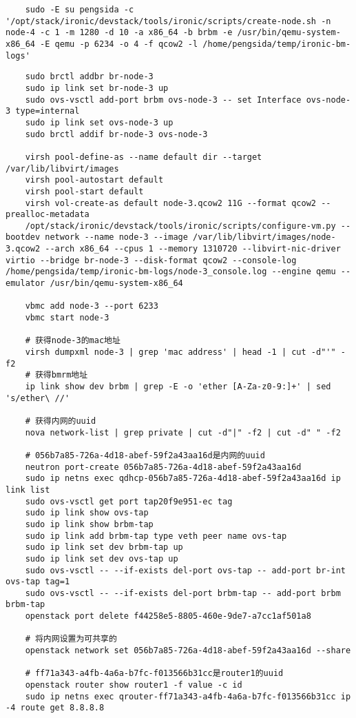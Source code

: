 \documentclass[a4paper,left=1.5cm,right=1.5cm,11pt]{article}
\begin{document}
	\begin{lstlisting}
	sudo -E su pengsida -c '/opt/stack/ironic/devstack/tools/ironic/scripts/create-node.sh -n node-4 -c 1 -m 1280 -d 10 -a x86_64 -b brbm -e /usr/bin/qemu-system-x86_64 -E qemu -p 6234 -o 4 -f qcow2 -l /home/pengsida/temp/ironic-bm-logs'
	\end{lstlisting}

	\begin{lstlisting}
	sudo brctl addbr br-node-3
	sudo ip link set br-node-3 up
	sudo ovs-vsctl add-port brbm ovs-node-3 -- set Interface ovs-node-3 type=internal
	sudo ip link set ovs-node-3 up
	sudo brctl addif br-node-3 ovs-node-3

	virsh pool-define-as --name default dir --target /var/lib/libvirt/images
	virsh pool-autostart default
	virsh pool-start default
	virsh vol-create-as default node-3.qcow2 11G --format qcow2 --prealloc-metadata
	/opt/stack/ironic/devstack/tools/ironic/scripts/configure-vm.py --bootdev network --name node-3 --image /var/lib/libvirt/images/node-3.qcow2 --arch x86_64 --cpus 1 --memory 1310720 --libvirt-nic-driver virtio --bridge br-node-3 --disk-format qcow2 --console-log /home/pengsida/temp/ironic-bm-logs/node-3_console.log --engine qemu --emulator /usr/bin/qemu-system-x86_64
	
	vbmc add node-3 --port 6233
	vbmc start node-3

	# 获得node-3的mac地址
	virsh dumpxml node-3 | grep 'mac address' | head -1 | cut -d"'" -f2
	# 获得bmrm地址
	ip link show dev brbm | grep -E -o 'ether [A-Za-z0-9:]+' | sed 's/ether\ //'

	# 获得内网的uuid
	nova network-list | grep private | cut -d"|" -f2 | cut -d" " -f2

	# 056b7a85-726a-4d18-abef-59f2a43aa16d是内网的uuid
	neutron port-create 056b7a85-726a-4d18-abef-59f2a43aa16d
	sudo ip netns exec qdhcp-056b7a85-726a-4d18-abef-59f2a43aa16d ip link list
	sudo ovs-vsctl get port tap20f9e951-ec tag
	sudo ip link show ovs-tap
	sudo ip link show brbm-tap
	sudo ip link add brbm-tap type veth peer name ovs-tap
	sudo ip link set dev brbm-tap up
	sudo ip link set dev ovs-tap up
	sudo ovs-vsctl -- --if-exists del-port ovs-tap -- add-port br-int ovs-tap tag=1
	sudo ovs-vsctl -- --if-exists del-port brbm-tap -- add-port brbm brbm-tap
	openstack port delete f44258e5-8805-460e-9de7-a7cc1af501a8

	# 将内网设置为可共享的
	openstack network set 056b7a85-726a-4d18-abef-59f2a43aa16d --share

	# ff71a343-a4fb-4a6a-b7fc-f013566b31cc是router1的uuid
	openstack router show router1 -f value -c id
	sudo ip netns exec qrouter-ff71a343-a4fb-4a6a-b7fc-f013566b31cc ip -4 route get 8.8.8.8
	\end{lstlisting}
\end{document}
